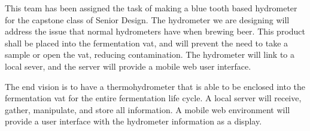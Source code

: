This team has been assigned the task of making a blue tooth based hydrometer for the capstone class of Senior Design.  The hydrometer we are designing will address the issue that normal hydrometers have when brewing beer.  This product shall be placed into the fermentation vat, and will prevent the need to take a sample or open the vat, reducing contamination.  The hydrometer will link to a local sever, and the server will provide a mobile web user interface.

The end vision is to have a thermohydrometer that is able to be enclosed into the fermentation vat for the entire fermentation life cycle.  A local server will receive, gather, manipulate, and store all information.  A mobile web environment will provide a user interface with the hydrometer information as a display.